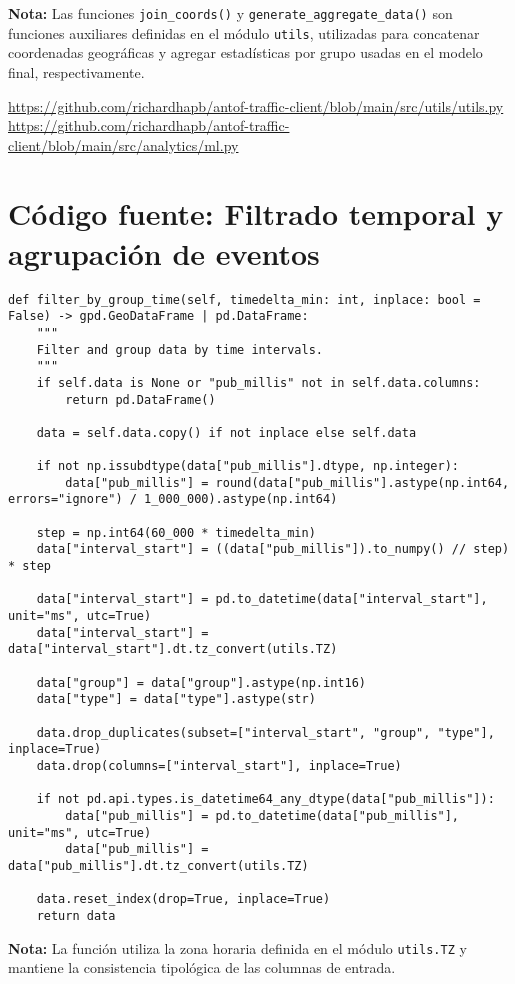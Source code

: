 \documentclass[12pt]{article}
\begin{document}
\noindent\textbf{Nota:}
Las funciones \texttt{join\_coords()} y \texttt{generate\_aggregate\_data()} son funciones auxiliares definidas en el módulo \texttt{utils}, utilizadas para concatenar coordenadas geográficas y agregar estadísticas por grupo usadas en el modelo final, respectivamente.

\url{https://github.com/richardhapb/antof-traffic-client/blob/main/src/utils/utils.py} \\
\url{https://github.com/richardhapb/antof-traffic-client/blob/main/src/analytics/ml.py}
\newpage

\section{Código fuente: Filtrado temporal y agrupación de eventos}
\label{annex:filter_code}

\begin{verbatim}
def filter_by_group_time(self, timedelta_min: int, inplace: bool = False) -> gpd.GeoDataFrame | pd.DataFrame:
    """
    Filter and group data by time intervals.
    """
    if self.data is None or "pub_millis" not in self.data.columns:
        return pd.DataFrame()

    data = self.data.copy() if not inplace else self.data

    if not np.issubdtype(data["pub_millis"].dtype, np.integer):
        data["pub_millis"] = round(data["pub_millis"].astype(np.int64, errors="ignore") / 1_000_000).astype(np.int64)

    step = np.int64(60_000 * timedelta_min)
    data["interval_start"] = ((data["pub_millis"]).to_numpy() // step) * step

    data["interval_start"] = pd.to_datetime(data["interval_start"], unit="ms", utc=True)
    data["interval_start"] = data["interval_start"].dt.tz_convert(utils.TZ)

    data["group"] = data["group"].astype(np.int16)
    data["type"] = data["type"].astype(str)

    data.drop_duplicates(subset=["interval_start", "group", "type"], inplace=True)
    data.drop(columns=["interval_start"], inplace=True)

    if not pd.api.types.is_datetime64_any_dtype(data["pub_millis"]):
        data["pub_millis"] = pd.to_datetime(data["pub_millis"], unit="ms", utc=True)
        data["pub_millis"] = data["pub_millis"].dt.tz_convert(utils.TZ)

    data.reset_index(drop=True, inplace=True)
    return data
\end{verbatim}

\noindent\textbf{Nota:}
La función utiliza la zona horaria definida en el módulo \texttt{utils.TZ} y mantiene la consistencia tipológica de las columnas de entrada.
\newpage



\end{document}
